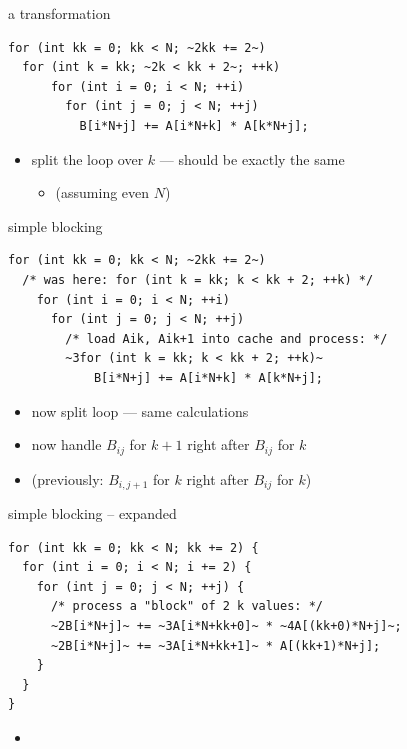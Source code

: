 \begin{frame}[fragile,label=cacheBlockKPrep]{a transformation}
\begin{lstlisting}
for (int kk = 0; kk < N; ~2kk += 2~)
  for (int k = kk; ~2k < kk + 2~; ++k)
      for (int i = 0; i < N; ++i)
        for (int j = 0; j < N; ++j)
          B[i*N+j] += A[i*N+k] * A[k*N+j];
\end{lstlisting}
\begin{itemize}
\item split the loop over $k$ --- should be exactly the same 
    \begin{itemize}
    \item (assuming even $N$)
    \end{itemize}
\end{itemize}
\end{frame}

\begin{frame}[fragile,label=cacheBlockK]{simple blocking}
\begin{lstlisting}
for (int kk = 0; kk < N; ~2kk += 2~)
  /* was here: for (int k = kk; k < kk + 2; ++k) */
    for (int i = 0; i < N; ++i)
      for (int j = 0; j < N; ++j)
        /* load Aik, Aik+1 into cache and process: */
        ~3for (int k = kk; k < kk + 2; ++k)~
            B[i*N+j] += A[i*N+k] * A[k*N+j];
\end{lstlisting}
\begin{itemize}
\item now  split loop --- same calculations
\item<2-> now handle $B_{ij}$ for $k+1$ right after $B_{ij}$ for $k$
\item<2-> (previously: $B_{i,j+1}$ for $k$ right after $B_{ij}$ for $k$)
\end{itemize}
\end{frame}

\begin{frame}[fragile,label=cacheBlockKExpand]{simple blocking -- expanded}
\begin{lstlisting}
for (int kk = 0; kk < N; kk += 2) {
  for (int i = 0; i < N; i += 2) {
    for (int j = 0; j < N; ++j) {
      /* process a "block" of 2 k values: */
      ~2B[i*N+j]~ += ~3A[i*N+kk+0]~ * ~4A[(kk+0)*N+j]~;
      ~2B[i*N+j]~ += ~3A[i*N+kk+1]~ * A[(kk+1)*N+j];
    }
  }
}
\end{lstlisting}
\begin{itemize}
\item {}
\end{itemize}
\end{frame}

